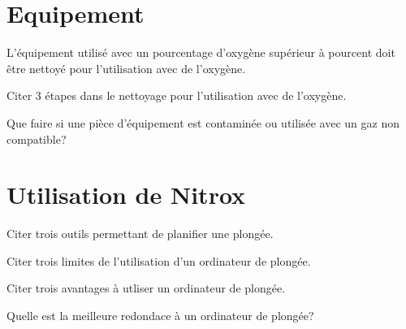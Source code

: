 \documentclass[english,12pt,a4paper]{article}
\begin{document}
	\section{Equipement}
	\begin{outline}
		\1 L'équipement utilisé avec un pourcentage d'oxygène supérieur à \underline{\hspace{1.5cm}} pourcent doit être nettoyé pour l'utilisation avec de l'oxygène.

		\1 Citer 3 étapes dans le nettoyage pour l'utilisation avec de l'oxygène.
			\2[] \hspace{-2em}\hrulefill
			\2[] \hspace{-2em}\hrulefill
			\2[] \hspace{-2em}\hrulefill

		\1 Que faire si une pièce d'équipement est contaminée ou utilisée avec un gaz non compatible?
			\2[] \hspace{-2em}\hrulefill
			\2[] \hspace{-2em}\hrulefill
			\2[] \hspace{-2em}\hrulefill
	\end{outline}
	\pagebreak

	\section{Utilisation de Nitrox}
	\begin{outline}
		\1 Citer trois outils permettant de planifier une plongée.
			\2[] \hspace{-2em}\hrulefill
			\2[] \hspace{-2em}\hrulefill
			\2[] \hspace{-2em}\hrulefill

		\1 Citer trois limites de l'utilisation d'un ordinateur de plongée.
			\2[] \hspace{-2em}\hrulefill
			\2[] \hspace{-2em}\hrulefill
			\2[] \hspace{-2em}\hrulefill

		\1 Citer trois avantages à utliser un ordinateur de plongée.
			\2[] \hspace{-2em}\hrulefill
			\2[] \hspace{-2em}\hrulefill
			\2[] \hspace{-2em}\hrulefill

		\1 Quelle est la meilleure redondace à un ordinateur de plongée?
			\2[] \hspace{-2em}\hrulefill
			\2[] \hspace{-2em}\hrulefill
	\end{outline}
	\pagebreak
\end{document}
